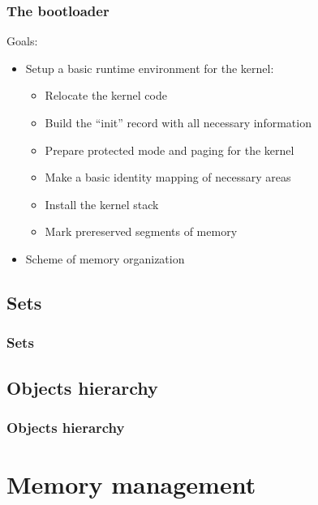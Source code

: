 \begin{frame}
  \frametitle{The bootloader}

  Goals:

  \nl

  \begin{itemize}[<+->]
  \item Setup a basic runtime environment for the kernel:
    \begin{itemize}[<+->]
    \item Relocate the kernel code
    \item Build the ``init'' record with all necessary information
    \item Prepare protected mode and paging for the kernel
    \item Make a basic identity mapping of necessary areas
    \item Install the kernel stack
    \item Mark prereserved segments of memory
    \end{itemize}
  \item Scheme of memory organization
  \end{itemize}

\end{frame}

%
%

\subsection{Sets}


\begin{frame}
  \frametitle{Sets}
\end{frame}

%
%

\subsection{Objects hierarchy}


\begin{frame}
  \frametitle{Objects hierarchy}
\end{frame}

%
%

\section{Memory management}

